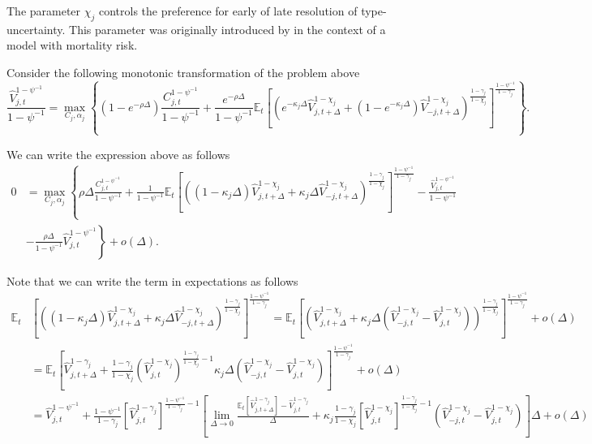 \documentclass[11pt,english]{article}
\begin{document}
The parameter $\chi_j$ controls the preference for early of late resolution of type-uncertainty. This parameter was originally introduced by \citet{garleanu2015young} in the context of a model with mortality risk.

Consider the following monotonic transformation of the problem above
\begin{equation*}
    \frac{\hat{V}_{j,t}^{1-\psi^{-1}}}{1-\psi^{-1}} = \max_{C_j,\alpha_j}\left\{ (1-e^{-\rho \Delta}) \frac{C_{j,t}^{1-\psi^{-1}}}{1-\psi^{-1}} + \frac{e^{-\rho \Delta}}{1-\psi^{-1}} \mathbb{E}_t\left[  \left( e^{-\kappa_{j} \Delta } \hat{V}_{j,t+\Delta}^{1-\chi_j} + (1-e^{-\kappa_j \Delta} ) \hat{V}_{-j,t+\Delta}^{1-\chi_j}\right)^{\frac{1-\gamma_j}{1-\chi_j}} \right]^{\frac{1-\psi^{-1}}{1-\gamma_j}}\right\}.
\end{equation*}

We can write the expression above as follows
\begin{align*}
    0 &= \max_{C_j,\alpha_j}\left\{ \rho \Delta \frac{C_{j,t}^{1-\psi^{-1}}}{1-\psi^{-1}} + \frac{1}{1-\psi^{-1}} \mathbb{E}_t\left[  \left( (1-\kappa_{j} \Delta) \hat{V}_{j,t+\Delta}^{1-\chi_j} + \kappa_j \Delta  \hat{V}_{-j,t+\Delta}^{1-\chi_j}\right)^{\frac{1-\gamma_j}{1-\chi_j}} \right]^{\frac{1-\psi^{-1}}{1-\gamma_j}} -\frac{\hat{V}_{j,t}^{1-\psi^{-1}}}{1-\psi^{-1}}\right.
    \\
    &\left.-\frac{\rho \Delta}{1-\psi^{-1}} \hat{V}_{j,t}^{1-\psi^{-1}}\right\} + o(\Delta).
\end{align*}

Note that we can write the term in expectations as follows\small
\begin{align*}
    \mathbb{E}_t&\left[  \left( (1-\kappa_{j} \Delta) \hat{V}_{j,t+\Delta}^{1-\chi_j} + \kappa_j \Delta  \hat{V}_{-j,t+\Delta}^{1-\chi_j}\right)^{\frac{1-\gamma_j}{1-\chi_j}} \right]^{\frac{1-\psi^{-1}}{1-\gamma_j}} = 
    \mathbb{E}_t\left[  \left( \hat{V}_{j,t+\Delta}^{1-\chi_j}+ \kappa_j \Delta  (\hat{V}_{-j,t}^{1-\chi_j}-\hat{V}_{j,t}^{1-\chi_j})\right)^{\frac{1-\gamma_j}{1-\chi_j}} \right]^{\frac{1-\psi^{-1}}{1-\gamma_j}}+o(\Delta)\\
    & = 
    \mathbb{E}_t\left[ \hat{V}_{j,t+\Delta}^{1-\gamma_j} + \frac{1-\gamma_j}{1-\chi_j}   \left( \hat{V}_{j,t}^{1-\chi_j}\right)^{\frac{1-\gamma_j}{1-\chi_j}-1}\kappa_j \Delta  (\hat{V}_{-j,t}^{1-\chi_j}-\hat{V}_{j,t}^{1-\chi_j}) \right]^{\frac{1-\psi^{-1}}{1-\gamma_j}}+o(\Delta)\\
    &= \hat{V}_{j,t}^{1-\psi^{-1}}+\frac{1-\psi^{-1}}{1-\gamma_j} \left[  \hat{V}_{j,t}^{1-\gamma_j}  \right]^{\frac{1-\psi^{-1}}{1-\gamma_j}-1} \left[ 
    \lim_{\Delta \rightarrow 0} \frac{\mathbb{E}_t[\hat{V}_{j,t+\Delta}^{1-\gamma_j}] -\hat{V}_{j,t}^{1-\gamma_j} }{\Delta} +
     \kappa_j\frac{1-\gamma_j}{1-\chi_j} \left[ \hat{V}_{j,t}^{1-\chi_j}\right]^{\frac{1-\gamma_j}{1-\chi_j}-1}\left(  \hat{V}_{-j,t}^{1-\chi_j}-\hat{V}_{j,t}^{1-\chi_j} \right)\right]\Delta+o(\Delta)
\end{align*}\normalsize
\end{document}
